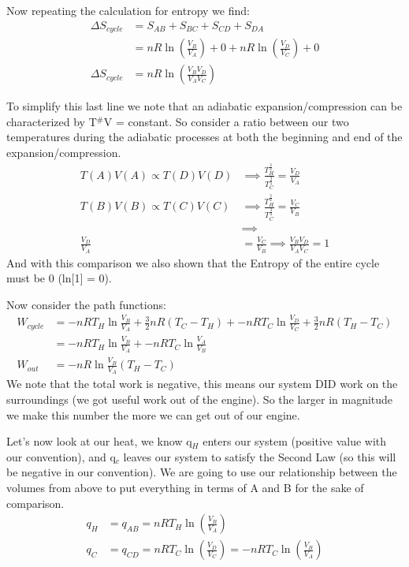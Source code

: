 \documentclass{article}
\newcommand{\be}{\begin{equation}}
\newcommand{\ee}{\end{equation}}
\begin{document}
Now repeating the calculation for entropy we find:
\be
\begin{split}
\Delta S_{cycle} &= S_{AB} + S_{BC} + S_{CD} + S_{DA} \\
& =  nR\ln\left(\frac{V_B}{V_A}\right) + 0 +  nR\ln\left(\frac{V_D}{V_C}\right) + 0 \\
\Delta S_{cycle} &= nR\ln\left(\frac{V_BV_D}{V_AV_C}\right)
\end{split}
\ee

To simplify this last line we note that an adiabatic expansion/compression can be characterized by T$^\#$V = constant. 
So consider a ratio between our two temperatures during the adiabatic processes at both the beginning and end of the expansion/compression.
\be
\begin{split}
T(A)V(A) \propto T(D)V(D) &\implies \frac{T^{\frac{3}{2}}_H}{T^{\frac{3}{2}}_C} = \frac{V_D}{V_A}\\
T(B)V(B) \propto T(C)V(C) &\implies \frac{T^{\frac{3}{2}}_H}{T^{\frac{3}{2}}_C} = \frac{V_C}{V_B}\\ 
&\implies\\
\frac{V_D}{V_A} &= \frac{V_C}{V_B} \implies \frac{V_BV_D}{V_AV_C} = 1
\end{split}
\ee
And with this comparison we also shown that the Entropy of the entire cycle must be 0 (ln[1] = 0). 

Now consider the path functions:
\be
\begin{split}
    W_{cycle} &= -nRT_H\ln\frac{V_B}{V_A} + \frac{3}{2} nR(T_C-T_H) + -nRT_C\ln\frac{V_D}{V_C} + \frac{3}{2} nR(T_H-T_C) \\
    &= -nRT_H\ln\frac{V_B}{V_A} + -nRT_C\ln\frac{V_A}{V_B} \\
    W_{out}&= -nR\ln\frac{V_B}{V_A}(T_H-T_C)
\end{split}
\ee
We note that the total work is negative, this means our system DID work on the surroundings (we got useful work out of the engine). 
So the larger in magnitude we make this number the more we can get out of our engine. 

Let's now look at our heat, we know q$_H$ enters our system (positive value with our convention), and q$_c$ leaves our system to satisfy the Second Law (so this will be negative in our convention). 
We are going to use our relationship between the volumes from above to put everything in terms of A and B for the sake of comparison. 
\be
\begin{split}
    q_H &= q_{AB} = nRT_H \ln \left(\frac{V_B}{V_A}\right)\\
    q_C &= q_{CD} = nRT_C \ln \left(\frac{V_D}{V_C}\right) = -nRT_C \ln \left(\frac{V_B}{V_A}\right) 
\end{split}
\ee
\end{document}
